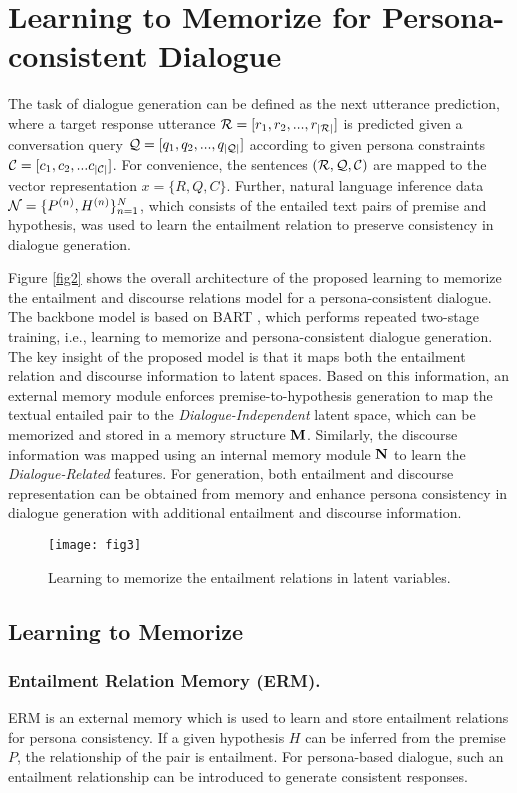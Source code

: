 \documentclass[letterpaper]{article} \usepackage{aaai23}  \usepackage{times}  \usepackage{helvet}  \usepackage{courier}  \usepackage[hyphens]{url}  \usepackage{graphicx} \urlstyle{rm} \def\UrlFont{\rm}  \usepackage{natbib}  \usepackage{caption} \frenchspacing  \setlength{\pdfpagewidth}{8.5in}  \setlength{\pdfpageheight}{11in}  \usepackage{algorithm}
\begin{document}
\section{Learning to Memorize for Persona-consistent Dialogue}
The task of dialogue generation can be defined as the next utterance prediction, where a target response utterance ${\cal R} = [{r_1},{r_2},...,{r_{|{\cal R}|}}]$ is predicted given a conversation query ${\cal Q} = [{q_1},{q_2},...,{q_{|{\cal Q}|}}]$ according to given persona constraints ${\cal C} = [{c_1},{c_2},...{c_{{\rm{|}}{\cal C}{\rm{|}}}}]$. For convenience, the sentences $({\cal R},{\cal Q},{\cal C})$ are mapped to the vector representation $x=\{R,Q,C\}$. Further, natural language inference data \cite{Welleck2020,Williams2018} ${\cal N} = \{ {P^{(n)}},{H^{(n)}}\} _{n = 1}^N$, which consists of the entailed text pairs of premise and hypothesis, was used to learn the entailment relation to preserve consistency in dialogue generation.

Figure \ref{fig2} shows the overall architecture of the proposed learning to memorize the entailment and discourse relations model for a persona-consistent dialogue. The backbone model is based on BART \cite{Lewis2020}, which performs repeated two-stage  training, i.e., learning to memorize and persona-consistent dialogue generation. The key insight of the proposed model is that it maps both the entailment relation and discourse information to latent spaces. Based on this information, an external memory module enforces premise-to-hypothesis generation to map the textual entailed pair to the \textit{Dialogue-Independent} latent space, which can be memorized and stored in a memory structure ${\bf{M}}$. Similarly, the discourse information was mapped using an internal memory module ${\bf{N}}$ to learn the \textit{Dialogue-Related} features. For generation, both entailment and discourse representation can be obtained from memory and enhance persona consistency in dialogue generation with additional entailment and discourse information.

\begin{figure*}[t]
\centering
\texttt{[image: fig3]} \caption{Learning to memorize the entailment relations in latent variables.}
\label{fig3}
\end{figure*}
\subsection{Learning to Memorize}
\subsubsection{Entailment Relation Memory (ERM).}
ERM is an external memory which is used to learn and store entailment relations for persona consistency. If a given hypothesis $H$ can be inferred from the premise $P$, the relationship of the pair is entailment. For persona-based dialogue, such an entailment relationship can be introduced to generate consistent responses. 
\end{document}
